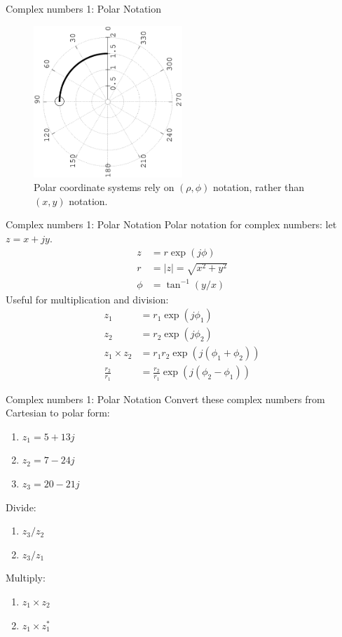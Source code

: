 \documentclass{beamer}
\begin{document}
\begin{frame}{Complex numbers 1: Polar Notation}
\begin{figure}
\centering
\includegraphics[width=0.5\textwidth,angle=270,trim=4cm 2cm 0cm 0cm]{figures/polar.eps}
\caption{\label{fig:complex3} Polar coordinate systems rely on $(\rho,\phi)$ notation, rather than $(x,y)$ notation.}
\end{figure}
\end{frame}

\begin{frame}{Complex numbers 1: Polar Notation}
Polar notation for complex numbers: let $z = x+jy$.
\begin{align}
z &= r \exp(j\phi) \\
r &= |z| = \sqrt{x^2 + y^2} \\
\phi &= \tan^{-1}(y/x)
\end{align}
Useful for multiplication and division:
\begin{align}
z_1 &= r_1 \exp(j\phi_1) \\
z_2 &= r_2 \exp(j\phi_2) \\
z_1 \times z_2 &= r_1 r_2 \exp(j(\phi_1 + \phi_2)) \\
\frac{r_2}{r_1} &= \frac{r_2}{r_1} \exp(j(\phi_2 - \phi_1))
\end{align}
\end{frame}

\begin{frame}{Complex numbers 1: Polar Notation}
\small
Convert these complex numbers from Cartesian to polar form:
\begin{enumerate}
\item $z_1 = 5+13j$
\item $z_2 = 7-24j$
\item $z_3 = 20-21j$
\end{enumerate}
Divide:
\begin{enumerate}
\item $z_3/z_2$
\item $z_3/z_1$
\end{enumerate}
Multiply:
\begin{enumerate}
\item $z_1 \times z_2$
\item $z_1 \times z_1^*$
\end{enumerate}
\end{frame}
\end{document}

